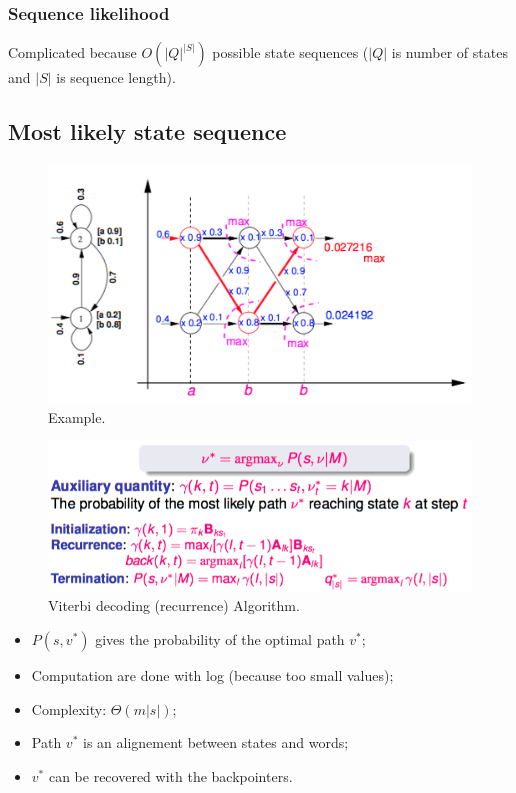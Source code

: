\subsubsection{Sequence likelihood}
Complicated because $O(|Q|^{|S|})$ possible state sequences ($|Q|$ is number of states and $|S|$ is sequence length).


\subsection{Most likely state sequence}

\begin{figure}[htp]
	\centering
	\includegraphics[scale=0.6]{images/30_viterbi.png}
 	\caption{Example.}
\end{figure}

\begin{figure}[htp]
	\centering
	\includegraphics[scale=0.6]{images/31_viterbi.png}
 	\caption{Viterbi decoding (recurrence) Algorithm.}
\end{figure}

\begin{itemize}
	\item $P(s, v^*)$ gives the probability of the optimal path $v^*$;
	\item Computation are done with log (because too small values);
	\item Complexity: $\Theta(m|s|)$;
	\item Path $v^*$ is an alignement between states and words;
	\item $v^*$ can be recovered with the backpointers.
\end{itemize}

